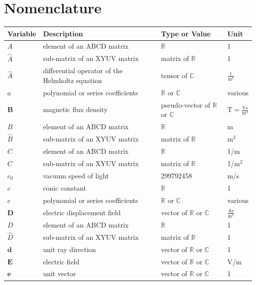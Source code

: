 \documentclass[12pt,a4paper,twoside,openright,BCOR10mm,headsepline,titlepage,abstracton,chapterprefix,final]{scrreprt}
\newcommand\Vector[1]{{\mathbf{#1}}}
\newcommand\vacuum{0}
\newcommand\scalarEfield{E}
\newcommand\scalarBfield{B}
\newcommand\scalarDfield{D}
\newcommand\Efield{\Vector{\scalarEfield}}
\newcommand\Bfield{\Vector{\scalarBfield}}
\newcommand\Dfield{\Vector{\scalarDfield}}
\newcommand\meter{\textrm{m}}
\newcommand\second{\textrm{s}}
\newcommand\ampere{\textrm{A}}
\newcommand\volt{\textrm{V}}
\newcommand\tesla{\textrm{T}}
\begin{document}





\chapter{Nomenclature}
\begin{tabular}{l|l|l|l}
 Variable & Description & Type or Value & Unit \\
 \hline
 $A$ & element of an ABCD matrix & $\mathbb{R}$ & 1 \\
 $\hat{A}$ & sub-matrix of an XYUV matrix & matrix of $\mathbb{R}$ & 1 \\
 $\hat{A}$ & differential operator of the Helmholtz equation & tensor of $\mathbb{C}$ & $\frac{1}{\meter^2}$\\
 $a$ & polynomial or series coefficients & $\mathbb{R}$ or $\mathbb{C}$ & various\\
 \hline
 $\Bfield$ & magnetic flux density & pseudo-vector of $\mathbb{R}$ or $\mathbb{C}$ & $\tesla = \frac{\volt\second}{\meter^2} $\\
 $B$ & element of an ABCD matrix & $\mathbb{R}$ & \meter \\
 $\hat{B}$ & sub-matrix of an XYUV matrix & matrix of $\mathbb{R}$ & $\meter^2$ \\
 \hline
 $C$ & element of an ABCD matrix & $\mathbb{R}$ & 1/\meter\\
 $\hat{C}$ & sub-matrix of an XYUV matrix & matrix of $\mathbb{R}$ & 1/$\meter^2$\\
 $c_\vacuum$ & vacuum speed of light & 299792458 & \meter /\second \\
 $c$ & conic constant & $\mathbb{R}$ & 1 \\
 $c$ & polynomial or series coefficients & $\mathbb{R}$ or $\mathbb{C}$ & various\\
 \hline
 $\Dfield$ & electric displacement field & vector of $\mathbb{R}$ or $\mathbb{C}$ & $\frac{\ampere \second}{\meter^2}$\\
 $D$ & element of an ABCD matrix & $\mathbb{R}$ & 1\\
 $\hat{D}$ & sub-matrix of an XYUV matrix & matrix of $\mathbb{R}$ & 1\\
 $\Vector{d}$ & unit ray direction & vector of $\mathbb{R}$ or $\mathbb{C}$ & 1\\
 \hline
 $\Efield$ & electric field & vector of $\mathbb{R}$ or $\mathbb{C}$ & \volt /\meter \\
 $\Vector{e}$ & unit vector & vector of $\mathbb{R}$ or $\mathbb{C}$ & 1\\

\end{tabular}
\end{document}
